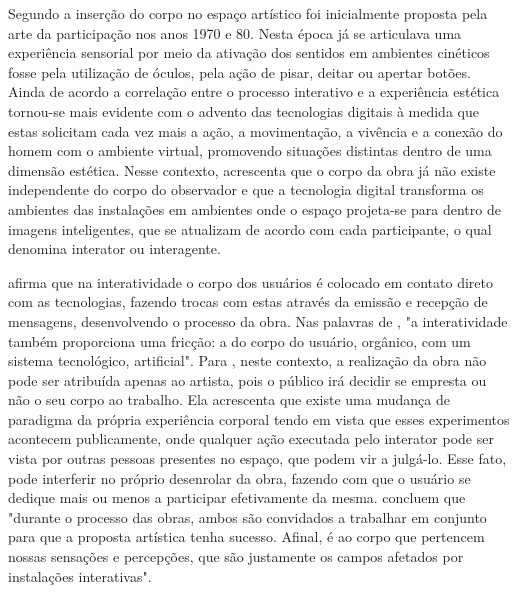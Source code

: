 Segundo  a inserção do corpo no espaço artístico foi inicialmente proposta pela arte da participação nos anos 1970 e 80. Nesta época já se articulava uma experiência sensorial por meio da ativação dos sentidos em ambientes cinéticos fosse pela utilização de óculos, pela ação de pisar, deitar ou apertar botões. Ainda de acordo  a correlação entre o processo interativo e a experiência estética tornou-se mais evidente com o advento das tecnologias digitais à medida que estas solicitam cada vez mais a ação, a movimentação, a vivência e a conexão do homem com o ambiente virtual, promovendo situações distintas dentro de uma dimensão estética. Nesse contexto,  acrescenta que o corpo da obra já não existe independente do corpo do observador e que a tecnologia digital transforma os ambientes das instalações em ambientes onde o espaço projeta-se para dentro de imagens inteligentes, que se atualizam de acordo com cada participante, o qual denomina interator ou interagente.

 afirma que na interatividade o corpo dos usuários é colocado em contato direto com as tecnologias, fazendo trocas com estas através da emissão e recepção de mensagens, desenvolvendo o processo da obra. Nas palavras de , "a interatividade também proporciona uma fricção: a do corpo do usuário, orgânico, com um sistema tecnológico, artificial". Para , neste contexto, a realização da obra não pode ser atribuída apenas ao artista, pois o público irá decidir se empresta ou não o seu corpo ao trabalho. Ela acrescenta que existe uma mudança de paradigma da própria experiência corporal tendo em vista que esses experimentos acontecem publicamente, onde qualquer ação executada pelo interator pode ser vista por outras pessoas presentes no espaço, que podem vir a julgá-lo. Esse fato, pode interferir no próprio desenrolar da obra, fazendo com que o usuário se dedique mais ou menos a participar efetivamente da mesma.  concluem que "durante o processo das obras, ambos são convidados a trabalhar em conjunto para que a proposta artística tenha sucesso. Afinal, é ao corpo que pertencem nossas sensações e percepções, que são justamente os campos afetados por instalações interativas".
